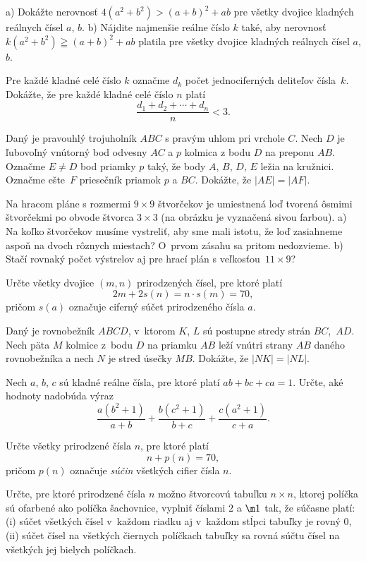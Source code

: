 {%
\ite a) Dokážte nerovnosť $4(a^2+b^2)>(a+b)^2+ab$ pre všetky dvojice
kladných reálnych čísel $a$, $b$.
\ite b) Nájdite najmenšie reálne číslo $k$ také, aby nerovnosť
$k(a^2+b^2)\geqq(a+b)^2+ab$ platila pre všetky dvojice kladných
reálnych čísel $a$, $b$.
}

{%
Pre každé kladné celé číslo $k$ označme $d_k$ počet jednociferných
deliteľov čísla~$k$. Dokážte, že pre každé kladné celé číslo $n$
platí
$$
\frac {d_{1}+d_{2}+\cdots+d_{n}}{n}<3.
$$
}

{%
Daný je pravouhlý trojuholník $ABC$ s pravým uhlom pri vrchole $C$.
Nech $D$ je ľubovoľný vnútorný bod odvesny $AC$ a $p$ kolmica z bodu $D$
na preponu $AB$. Označme $E\ne D$ bod priamky $p$ taký, že
body $A$, $B$, $D$, $E$ ležia na kružnici. Označme ešte~$F$
priesečník priamok $p$ a $BC$. Dokážte, že $|AE|=|AF|$.
}

{%
Na hracom pláne s rozmermi $9\times9$ štvorčekov je umiestnená
loď tvorená ôsmimi štvorčekmi po obvode štvorca $3\times3$ (na
obrázku je vyznačená sivou farbou).
\ite a) Na koľko štvorčekov musíme vystreliť, aby sme mali istotu,
že loď zasiahneme aspoň na dvoch rôznych miestach? O~prvom zásahu sa
pritom nedozvieme.
\ite b) Stačí rovnaký počet výstrelov aj pre hrací plán s veľkosťou~$11\times 9$?
}

{%
Určte všetky dvojice $(m,n)$ prirodzených čísel, pre ktoré platí
$$
2m+2s(n)=n\cdot s(m)=70,
$$
pričom $s(a)$ označuje ciferný súčet prirodzeného čísla $a$.
}

{%
Daný je rovnobežník $ABCD$, v~ktorom $K$, $L$ sú postupne stredy
strán $BC$,~$AD$. Nech päta $M$ kolmice z~bodu $D$
na priamku $AB$ leží vnútri strany $AB$ daného rovnobežníka a
nech $N$ je stred úsečky $MB$. Dokážte, že $|NK|=|NL|$.
}

{%
Nech $a$, $b$, $c$ sú kladné reálne čísla, pre ktoré platí $ab+bc+ca=1$.
Určte, aké hodnoty nadobúda výraz
$$
\frac{a(b^2+1)}{a+b}+\frac{b(c^2+1)}{b+c}+\frac{c(a^2+1)}{c+a}.
$$
}

{%
Určte všetky prirodzené čísla $n$, pre ktoré platí
$$
n+p(n)=70,
$$
pričom $p(n)$ označuje {\it súčin\/} všetkých cifier čísla $n$.
}

{%
Určte, pre ktoré prirodzené čísla $n$ možno štvorcovú tabuľku
$n\times n$, ktorej políčka sú ofarbené ako políčka
šachovnice, vyplniť číslami $2$ a $\m1$ tak, že súčasne platí:
\ite (i) súčet všetkých čísel v~každom riadku aj v~každom stĺpci tabuľky
je rovný 0,
\ite (ii) súčet čísel na všetkých čiernych políčkach tabuľky sa rovná
súčtu čísel na všetkých jej bielych políčkach.\endgraf
}

